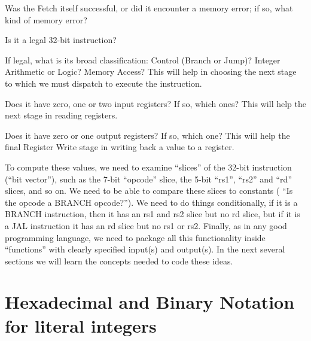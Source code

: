 \begin{tightlist}

 \item Was the Fetch itself successful, or did it encounter a memory
   error; if so, what kind of memory error?

 \item Is it a legal 32-bit instruction?

 \item If legal, what is its broad classification: Control (Branch or
   Jump)? Integer Arithmetic or Logic? Memory Access?  This will help
   in choosing the next stage to which we must dispatch to execute the
   instruction.

 \item Does it have zero, one or two input registers?  If so, which
   ones?  This will help the next stage in reading registers.

 \item Does it have zero or one output registers?  If so, which one?
   This will help the final Register Write stage in writing back a
   value to a register.

\end{tightlist}

To compute these values, we need to examine ``slices'' of the 32-bit
instruction (``bit vector''), such as the 7-bit ``opcode'' slice, the
5-bit ``rs1'', ``rs2'' and ``rd'' slices, and so on.  We need to be
able to compare these slices to constants ({\eg} ``Is the opcode a
BRANCH opcode?'').  We need to do things conditionally, {\eg} if it is
a BRANCH instruction, then it has an rs1 and rs2 slice but no rd
slice, but if it is a JAL instruction it has an rd slice but no rs1 or
rs2.  Finally, as in any good programming language, we need to package
all this functionality inside ``functions'' with clearly specified
input(s) and output(s).  In the next several sections we will learn
the {\BSV} concepts needed to code these ideas.


\section{Hexadecimal and Binary Notation for literal integers}

\label{BSV_hex_bin_literals}


